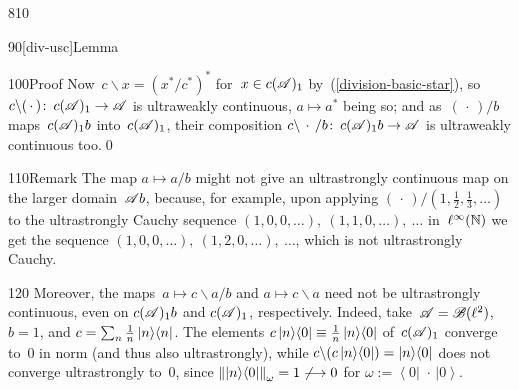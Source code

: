 \begin{parsec}{810}
\begin{point}{90}[div-usc]{Lemma}
\begin{point}{100}{Proof}
Now~$c\backslash x=(x^*/c^*)^*$
for~$x\in c(\mathscr{A})_1$
by~(\ref{division-basic-star}),
so~$c\backslash(\,\cdot\,)\colon\, c(\mathscr{A})_1\to\mathscr{A}$
is ultraweakly continuous,
$a\mapsto a^*$ being so;
and as~$(\,\cdot\,)/b$ maps~$c(\mathscr{A})_1b$ into~$c(\mathscr{A})_1$,
their composition $c\backslash\,\cdot\,/b\colon\,
c(\mathscr{A})_1b\to\mathscr{A}$
is ultraweakly continuous too.\qed
\end{point}
\begin{point}{110}{Remark}%
The map $a\mapsto a/b$ might not give
an ultrastrongly
continuous map on the larger domain~$\mathscr{A} b$,
because, for example, 
upon applying $(\,\cdot\,)/(1,\frac{1}{2},\frac{1}{3},\dotsc)$
to the ultrastrongly Cauchy 
sequence  $(1,0,0,\dotsc),\ (1,1,0,\dotsc),\ \dotsc$
    in~$\ell^\infty(\mathbb{N})$
we get the 
sequence $(1,0,0,\dotsc),\ (1,2,0,\dotsc),\ \dotsc$,
which is not ultrastrongly Cauchy.
\begin{point}{120}%
Moreover, the maps~$a\mapsto c\backslash a/b$
and $a\mapsto c\backslash a$
need not be ultrastrongly continuous,
    even on $c(\mathscr{A})_1b$ and $c(\mathscr{A})_1$, respectively.
Indeed, take~$\mathscr{A}=\mathscr{B}(\ell^2)$, $b=1$,
and
$c=\sum_n \frac{1}{n}\left|n\right>\!\left<n\right|$.
The elements
$c\left|n\right>\!\left<0\right| \equiv  \frac{1}{n}\left|n\right>\!\left<0\right|$
of~$c(\mathscr{A})_1$ converge to~$0$ in norm (and thus also ultrastrongly),
    while $c\backslash (c\left|n\right>\!\left<0\right|) =  \left|n\right>\!\left<0\right|$
    does not converge ultrastrongly to~$0$,
    since $\left\|\smash{\left|n\right>\!\left<0\right|}\right\|_\omega = 1 \not\longrightarrow 0$
for $\omega:=\left<0\right|\, \,\cdot\, \left|0\right>$.
\end{point}
\end{point}
\end{point}
\end{parsec}
